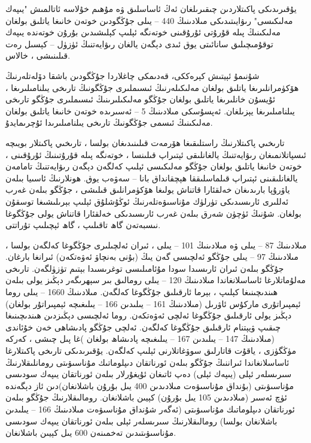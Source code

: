 \documentclass[a4paper]{article}
\begin{document}
\begin{flushright}
يۇقىرىدىكى پاكىتلاردىن چىقىرىلغان ئەڭ ئاساسلىق ۋە مۇھىم خۇلاسە ئاتالمىش "يىپەك مەلىكىسى" رىۋايىتىدىكى مىلادىنىڭ 440 – يىلى جۇڭگودىن خوتەن خانىغا ياتلىق بولغان مەلىكىنىڭ پىلە قۇرۇتى ئۇرۇقىنى خوتەنگە ئېلىپ كېلىشىدىن بۇرۇن خوتەندە يىپەك توقۇمىچىلىق سانائىتى يوق ئىدى دېگەن يالغان رىۋايەتنىڭ ئۈزۈل – كېسىل رەت قىلىنىشى ، خالاس.

شۇنىمۇ ئېيتىش كېرەككى، قەدىمكى چاغلاردا جۇڭگودىن باشقا دۆلەتلەرنىڭ ھۆكۈمرانلىرىغا ياتلىق بولغان مەلىكىلەرنىڭ ئىسىملىرى جۇڭگونىڭ تارىخى يىلنامىلىرىغا ، ئۇيسۇن خانلىرىغا ياتلىق بولغان جۇڭگو مەلىكىلىرىنىڭ ئىسىملىرى جۇڭگو تارىخى يىلنامىلىرىغا يېزىلغان. ئەپسۇسكى مىلادىنىڭ 5 – ئەسىرىدە خوتەن خانىغا ياتلىق بولغان مەلىكىنىڭ ئىسمى جۇڭگونىڭ تارىخى يىلنامىلىرىدا ئۇچرىمايدۇ.



تارىخىي پاكىتلارنىڭ راستلىقىغا ھۆرمەت قىلىنىدىغان بولسا ، تارىخىي پاكىتلار بويىچە ئىسپاتلانمىغان رىۋايەتنىڭ يالغانلىقى ئېتىراپ قىلىنسا ، خوتەنگە پىلە قۇرۇتىنىڭ ئۇرۇقىنى ، خوتەن خانىغا ياتلىق بولغان جۇڭگو مەلىكىسى ئېلىپ كەلگەن دېگەن رىۋايەتنىڭ تامامەن يالغانلىقىنى ئېتىراپ قىلماسلىققا ھېچقانداق بانا – سەۋەب يوق. ھونلارنىڭ ئاسىيا بىلەن ياۋرۇپا بارىدىغان خەلقئارا قاتناش يولىغا ھۆكۈمرانلىق قىلىشى ، جۇڭگو بىلەن غەرب ئەللىرى ئارىسىدىكى تۈرلۈك مۇناسىۋەتلەرنىڭ ئوڭۇشلۇق ئېلىپ بېرىلىشىغا توسقۇن بولغان. شۇنىڭ ئۈچۈن شەرق بىلەن غەرب ئارىسىدىكى خەلقئارا قاتناش يولى جۇڭگوغا نىسبەتەن گاھ تاقىلىپ ، گاھ ئېچىلىپ تۇراتتى.



مىلادىنىڭ 87 – يىلى ۋە مىلادىنىڭ 101 – يىلى ، ئىران ئەلچىلىرى جۇڭگوغا كەلگەن بولسا ، مىلادىنىڭ 97 – يىلى جۇڭگو ئەلچىسى گەن يىڭ (بۇنى بەنچاۋ ئەۋەتكەن) ئىرانغا بارغان. جۇڭگو بىلەن ئىران ئارىسىدا سودا مۇئامىلىسى توغرىسىدا بېتىم تۈزۈلگەن. تارىخى مەلۇماتلارغا ئاساسلانغاندا مىلادىنىڭ 120 – يىلى رومالىق بىر سېھرىگەر دېڭىز يولى بىلەن ھىندىچىنىغا كېلىپ ، بېرما ئارقىلىق جۇڭگوغا كەلگەن. مىلادىنىڭ 1660 – يىلى روما ئېمپىراتۇرى ماركۇس ئاۋرىل (مىلادىنىڭ 161 – يىلىدىن 166 – يىلىغىچە ئېمپىراتۇر بولغان) دېڭىز يولى ئارقىلىق جۇڭگوغا ئەلچى ئەۋەتكەن. روما ئەلچىسى دېڭىزدىن ھىندىچىنىغا چىقىپ ۋيېتنام ئارقىلىق جۇڭگوغا كەلگەن. ئەلچى جۇڭگو پادىشاھى خەن خۇئاندى (مىلادىنىڭ 147 – يىلىدىن 167 – يىلىغىچە پادىشاھ بولغان )غا پىل چىشى ، كەركە مۈڭگۈزى ، ياقۇت قاتارلىق سوۋغاتلارنى ئېلىپ كەلگەن. يۇقىرىدىكى تارىخى پاكىتلارغا ئاساسلانغاندا ئىراننىڭ جۇڭگو بىلەن ئورناتقان دىپلوماتىك مۇناسىۋىتى رومانلىقلارنىڭ سىرىسلەر ئېلى (يىپەك ئېلى) دەپ ئاتىغان ئۇيغۇرلار بىلەن ئورناتقان يىپەك سودىسى مۇناسىۋىتى (بۇنداق مۇناسىۋەت مىلادىدىن 400 يىل بۇرۇن باشلانغان)دىن ئاز دېگەندە ئۈچ ئەسىر (مىلادىدىن 105 يىل بۇرۇن) كېيىن باشلانغان. رومالىقلارنىڭ جۇڭگو بىلەن ئورناتقان دىپلوماتىك مۇناسىۋىتى (ئەگەر شۇنداق مۇناسىۋەت مىلادىنىڭ 166 – يىلىدىن باشلانغان بولسا) رومالىقلارنىڭ سىرىسلەر ئېلى بىلەن ئورناتقان يىپەك سودىسى مۇناسىۋىتىدىن تەخمىنەن 600 يىل كېيىن باشلانغان.




\end{flushright}
\end{document}
